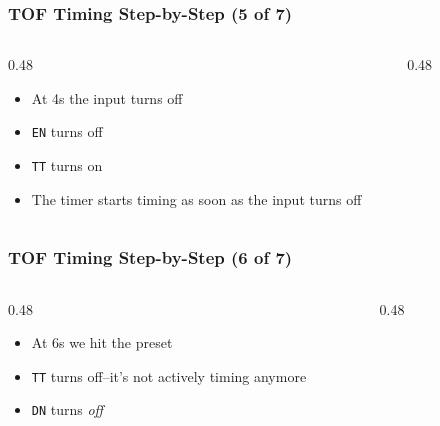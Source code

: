 \begin{frame}
    \frametitle{TOF Timing Step-by-Step (5 of 7)}

    \begin{columns}
        \begin{column}{0.48\linewidth}
            \begin{itemize}
                \item At 4s the input turns off
                \item \texttt{EN} turns off
                \item \texttt{TT} turns on
                \item The timer starts timing as soon as the input turns off
            \end{itemize}
        \end{column}
        \begin{column}{0.48\linewidth}
            \begin{figure}
                \centering
                \resizebox{\columnwidth}{!}{
                    
                }
            \end{figure}  
        \end{column}
    \end{columns}
\end{frame}

\begin{frame}
    \frametitle{TOF Timing Step-by-Step (6 of 7)}

    \begin{columns}
        \begin{column}{0.48\linewidth}
            \begin{itemize}
                \item At 6s we hit the preset
                \item \texttt{TT} turns off--it's not actively timing anymore
                \item \texttt{DN} turns \emph{off}
            \end{itemize}
        \end{column}
        \begin{column}{0.48\linewidth}
            \begin{figure}
                \centering
                \resizebox{\columnwidth}{!}{
                    
                }
            \end{figure}  
        \end{column}
    \end{columns}
\end{frame}

